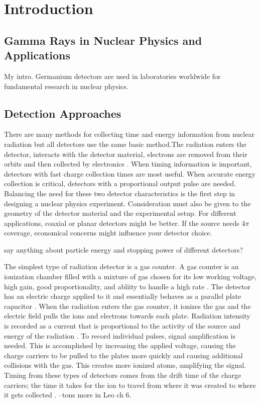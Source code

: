 \chapter{Introduction}
\label{ch:Introduction}

\section{Gamma Rays in Nuclear Physics and Applications}
\indent My intro.
Germanium detectors are used in laboratories worldwide for fundamental research in nuclear physics.

\section{Detection Approaches}
\indent There are many methods for collecting time and energy information from nuclear radiation but all detectors use the same basic method.The radiation enters the detector, interacts with the detector material, electrons are removed from their orbits and then collected by electronics \cite{KK88}. When timing information is important, detectors with fast charge collection times are most useful. When accurate energy collection is critical, detectors with a proportional output pulse are needed. Balancing the need for these two detector characteristics is the first step in designing a nuclear physics experiment. Consideration must also be given to the geometry of the detector material and the experimental setup. For different applications, coaxial or planar detectors might be better. If the source needs 4$\pi$ coverage, economical concerns might influence your detector choice. 

say anything about particle energy and stopping power of different detectors?

The simplest type of radiation detector is a gas counter. A gas counter is an ionization chamber filled with a mixture of gas chosen for its low working voltage, high gain, good proportionality, and abliity to handle a high rate \cite{Leo94}. The detector has an electric charge applied to it and essentially behaves as a parallel plate capacitor \cite{KK88}. When the radiation enters the gas counter, it ionizes the gas and the electric field pulls the ions and electrons towards each plate. Radiation intensity is recorded as a current that is proportional to the activity of the source and energy of the radiation \cite{KK88}. To record individual pulses, signal amplification is needed. This is accomplished by increasing the applied voltage, causing the charge carriers to be pulled to the plates more quickly and causing additional collisions with the gas. This creates more ionized atoms, amplifying the signal. Timing from these types of detectors comes from the drift time of the charge carriers; the time it takes for the ion to travel from where it was created to where it gets collected \cite{KK88}.
--tons more in Leo ch 6.

